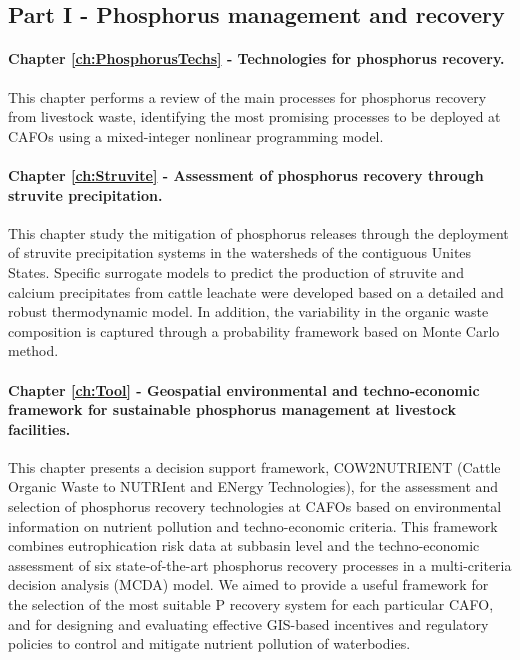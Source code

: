 \begin{refsection}[referencesCh1]
\subsection{Part I - Phosphorus management and recovery}
\paragraph{Chapter \ref{ch:PhosphorusTechs} - Technologies for phosphorus recovery.} This chapter performs a review of the main processes for phosphorus recovery from livestock waste, identifying the most promising processes to be deployed at CAFOs using a mixed-integer nonlinear programming model.

\paragraph{Chapter \ref{ch:Struvite} - Assessment of phosphorus recovery through struvite precipitation.} This chapter study the mitigation of phosphorus releases through the deployment of struvite precipitation systems in the watersheds of the contiguous Unites States. Specific surrogate models to predict the production of struvite and calcium precipitates from cattle leachate were developed based on a detailed and robust thermodynamic model. In addition, the variability in the organic waste composition is captured through a probability framework based on Monte Carlo method.

\paragraph{Chapter \ref{ch:Tool} - Geospatial environmental and techno-economic framework for sustainable phosphorus management at livestock facilities.} This chapter presents a decision support framework, COW2NUTRIENT (Cattle Organic Waste to NUTRIent and ENergy Technologies), for the assessment and selection of phosphorus recovery technologies at CAFOs based on environmental information on nutrient pollution and techno-economic criteria. This framework combines eutrophication risk data at subbasin level and the techno-economic assessment of six state-of-the-art phosphorus recovery processes in a multi-criteria decision analysis (MCDA) model. We aimed to provide a useful framework for the selection of the most suitable P recovery system for each particular CAFO, and for designing and evaluating effective GIS-based incentives and regulatory policies to control and mitigate nutrient pollution of waterbodies.


\end{refsection}
